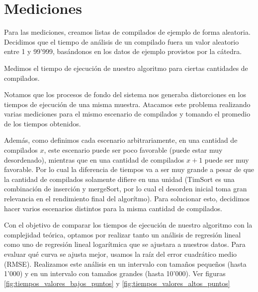 \section{Mediciones}

Para las mediciones, creamos listas de compilados de ejemplo de forma aleatoria. Decidimos que el tiempo
de análisis de un compilado fuera un valor aleatorio entre 1 y 99'999, basándonos en los datos de ejemplo
provistos por la cátedra.

Medimos el tiempo de ejecución de nuestro algoritmo para ciertas cantidades de compilados.

Notamos que los procesos de fondo del sistema nos generaba distorciones en los tiempos de ejecución de una misma muestra. Atacamos este problema
realizando varias mediciones para el mismo escenario de compilados y tomando el promedio de los tiempos obtenidos.

Además, como definimos cada escenario arbitrariamente, en una cantidad de compilados $x$, este escenario puede ser poco favorable (puede estar muy desordenado),
mientras que en una cantidad de compilados $x+1$ puede ser muy favorable. Por lo cual la diferencia de tiempos va a ser muy grande a pesar de que la cantidad
de compilados solamente difiere en una unidad (TimSort es una combinación de inserción y mergeSort, por lo cual el desorden inicial toma gran relevancia en el 
rendimiento final del algorítmo). Para solucionar esto, decidimos hacer varios escenarios distintos para la misma cantidad de compilados.

Con el objetivo de comparar los tiempos de ejecución de nuestro algoritmo con la complejidad teórica, optamos por 
realizar tanto un análisis de regresión lineal como uno de regresión lineal logarítmica que se ajustara a nuestros datos.
Para evaluar qué curva se ajusta mejor, usamos la raíz del error cuadrático medio (RMSE). Realizamos este análisis en un
intervalo con tamaños pequeños (hasta 1'000) y en un intervalo con tamaños grandes (hasta 10'000). Ver figuras \ref{fig:tiempos_valores_bajos_puntos} y
\ref{fig:tiempos_valores_altos_puntos}



